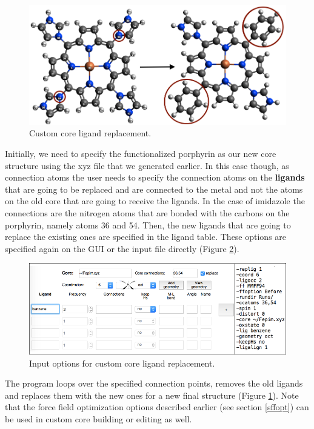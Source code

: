\documentclass[a4paper,12pt]{assignment}
\begin{document}
\begin{figure}[htb!]
\centering
\includegraphics[width=\textwidth]{./Figures/fig5a.png}
\caption{Custom core ligand replacement.}
\label{rep0}
\end{figure}

Initially, we need to specify the functionalized porphyrin as our new core structure using the xyz file that we generated earlier. In this case though, as connection atoms the user needs to specify the connection atoms on the \textbf{ligands} that are going to be replaced and are connected to the metal and not the atoms on the old core that are going to receive the ligands. In the case of imidazole the connections are the nitrogen atoms that are bonded with the carbons on the porphyrin, namely atoms 36 and 54. Then, the new ligands that are going to replace the existing ones are specified in the ligand table. These options are specified again on the GUI or the input file directly (Figure \ref{rep1}).

\begin{figure}[htb!]
\centering
\includegraphics[width=\textwidth]{./Figures/fig5b.png}
\caption{Input options for custom core ligand replacement.}
\label{rep1}
\end{figure}

The program loops over the specified connection points, removes the old ligands and replaces them with the new ones for a new final structure (Figure \ref{rep0}). Note that the force field optimization options described earlier (see section \ref{sffopt}) can be used in custom core building or editing as well.
\end{document}
